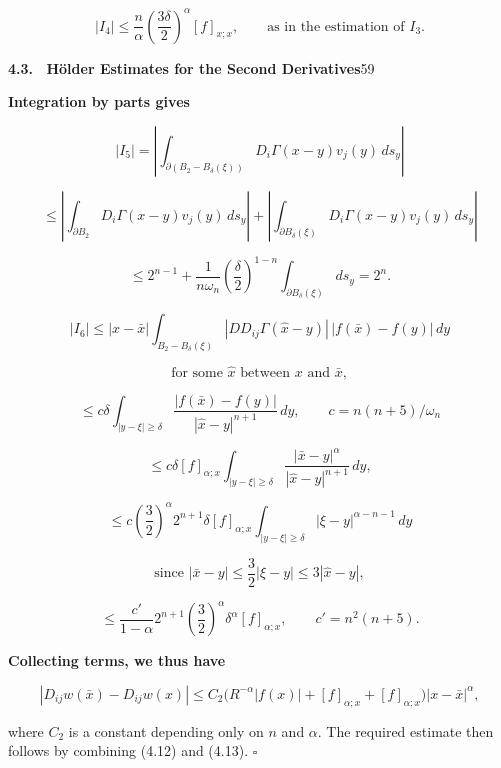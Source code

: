 \begin{lemma}
\begin{equation}
|I_4|\le \frac{n}{\alpha}\left(\frac{3\delta}{2}\right)^\alpha [f]_{x;x}, \qquad \text{as in the estimation of $I_3$.}
\end{equation}


\setcounter{section}{3}
\noindent\textbf{4.3. \ Hölder Estimates for the Second Derivatives}\hfill 59

\medskip

\noindent\textbf{Integration by parts gives}

\[
|I_5|=\left|\int_{\partial(B_2-B_\delta(\xi))} D_i\Gamma(x-y)v_j(y)\,ds_y\right|
\]

\[
\le \left|\int_{\partial B_2} D_i\Gamma(x-y)v_j(y)\,ds_y\right|
+\left|\int_{\partial B_\delta(\xi)} D_i\Gamma(x-y)v_j(y)\,ds_y\right|
\]

\[
\le 2^{n-1}+\frac{1}{n\omega_n}\left(\frac{\delta}{2}\right)^{1-n}\int_{\partial B_\delta(\xi)}ds_y=2^n.
\]

\[
|I_6|\le |x-\bar{x}|\int_{B_2-B_\delta(\xi)} |DD_{ij}\Gamma(\hat{x}-y)|\,|f(\bar{x})-f(y)|\,dy
\]

\[
\text{for some }\hat{x}\text{ between }x\text{ and }\bar{x},
\]

\[
\le c\delta\int_{|y-\xi|\ge \delta}\frac{|f(\bar{x})-f(y)|}{|\hat{x}-y|^{n+1}}\,dy,\qquad
c=n(n+5)/\omega_n
\]

\[
\le c\delta [f]_{\alpha;x}\int_{|y-\xi|\ge \delta}\frac{|\bar{x}-y|^\alpha}{|\hat{x}-y|^{n+1}}\,dy,
\]

\[
\le c\left(\frac32\right)^\alpha 2^{n+1}\delta [f]_{\alpha;x}\int_{|y-\xi|\ge \delta}|\xi-y|^{\alpha-n-1}\,dy
\]

\[
\text{since }|\bar{x}-y|\le \frac32|\xi-y|\le 3|\hat{x}-y|,
\]

\[
\le \frac{c'}{1-\alpha}2^{n+1}\left(\frac32\right)^\alpha \delta^\alpha [f]_{\alpha;x},\qquad
c'=n^2(n+5).
\]

\medskip

\noindent\textbf{Collecting terms, we thus have}

\[
\tag{4.13}
|D_{ij}w(\bar{x})-D_{ij}w(x)|\le C_2\bigl(R^{-\alpha}|f(x)|+[f]_{\alpha;x}+[f]_{\alpha;x}\bigr)|x-\bar{x}|^\alpha,
\]

\noindent where $C_2$ is a constant depending only on $n$ and $\alpha$. The required estimate then follows by combining (4.12) and (4.13). \hfill $\square$

\medskip


\end{lemma}
